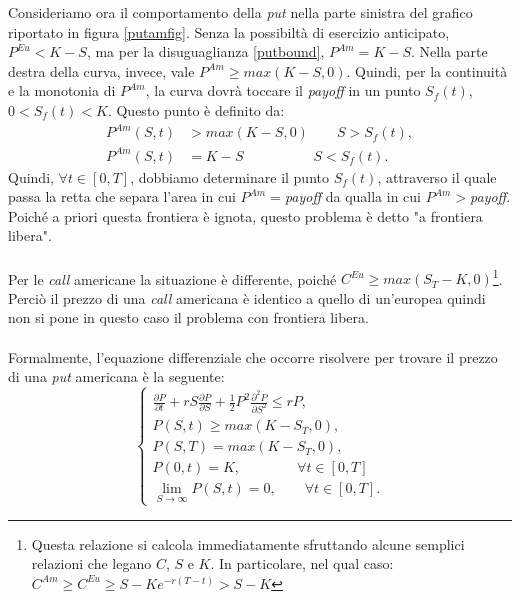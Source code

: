 \documentclass[a4paper,10pt]{report}
\newcommand{\der}[2]{\frac{\partial #1}{\partial #2}}
\newcommand{\dder}[2]{\frac{\partial^2 #1}{\partial #2^2}}
\theoremstyle{osservazione}
\theoremstyle{esempio}
\theoremstyle{notazione}
\theoremstyle{corollario}
\begin{document}
Consideriamo ora il comportamento della \emph{put} nella parte sinistra del grafico riportato in figura \ref{putamfig}. Senza la possibilt\`a di esercizio anticipato, $P^{Eu}<K-S$, ma per la disuguaglianza \ref{putbound}, $P^{Am}=K-S$. Nella parte destra della curva, invece, vale $P^{Am}\geq max(K-S,0)$. Quindi, per la continuit\`a e la monotonia di $P^{Am}$, la curva dovr\`a toccare il \emph{payoff} in un punto $S_f(t)$, $0<S_f(t)<K$. Questo punto \`e definito da:
\begin{align*}
P^{Am}(S,t)&>max(K-S,0)\qquad S>S_f(t),\\
P^{Am}(S,t)&=K-S\qquad\qquad\quad S<S_f(t).
\end{align*}
Quindi, $\forall t\in[0,T]$, dobbiamo determinare il punto $S_f(t)$, attraverso il quale passa la retta che separa l'area in cui $P^{Am}=$\emph{payoff} da qualla in cui $P^{Am}>$\emph{payoff}. Poich\'e a priori questa frontiera \`e ignota, questo problema \`e detto "a frontiera libera".\\\\Per le \emph{call} americane la situazione \`e differente, poich\'e $C^{Eu}\geq max(S_T-K,0)$\footnote{Questa relazione si calcola immediatamente sfruttando alcune semplici relazioni che legano $C$, $S$ e $K$. In particolare, nel qual caso: $C^{Am}\geq C^{Eu} \geq S-Ke^{-r(T-t)} > S-K$}. Perci\`o il prezzo di una \emph{call} americana \`e identico a quello di un'europea quindi non si pone in questo caso il problema con frontiera libera.\\\\Formalmente, l'equazione differenziale che occorre risolvere per trovare il prezzo di una \emph{put} americana \`e la seguente:
\begin{equation}
\begin{cases}
\displaystyle
\der{P}{t}+r S \der{P}{S} +\frac{1}{2}P^2\dder{P}{S}\leq rP,\\
P(S,t)\geq max(K-S_T,0),\\
P(S,T)=max(K-S_T,0),\\
P(0,t)=K,\qquad\qquad\forall t\in[0,T]\\
\lim\limits_{S\to\infty}P(S,t)=0,\qquad\forall t\in[0,T].
\end{cases}
\label{putam1d}
\end{equation}
\end{document}
